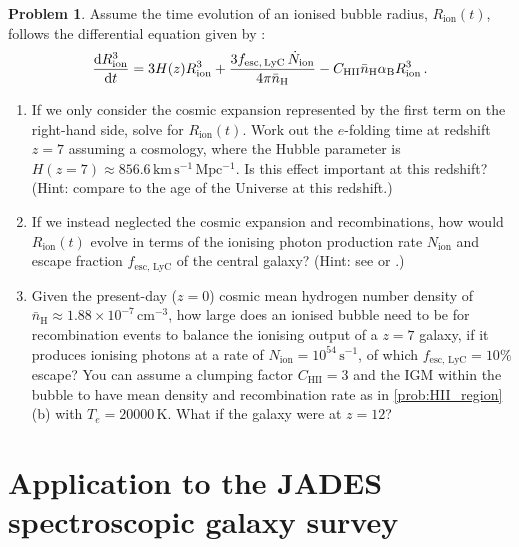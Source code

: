 \documentclass{article}
\theoremstyle{definition}
\newtheorem{problem}{Problem}[section]
\begin{document}
\begin{problem}
    \label{prob:bubble_radius_evolution}
    Assume the time evolution of an ionised bubble radius, $R_\text{ion}(t)$, follows the differential equation given by \citet{2000ApJ...542L..75C}:
    \begin{equation}
        \frac{\dif R_\mathrm{ion}^3}{\dif t} = 3 H(z) R_\mathrm{ion}^3 + \frac{3 f_\mathrm{esc, \, LyC} \, \dot{N}_\mathrm{ion}}{4\pi \bar{n}_\mathrm{H}} - C_\mathrm{HII} \bar{n}_\mathrm{H} \alpha_\mathrm{B} R_\mathrm{ion}^3 \, .
    \end{equation}
    \begin{enumerate}[label=(\alph*)]
        \item If we only consider the cosmic expansion represented by the first term on the right-hand side, solve for $R_\text{ion}(t)$. Work out the $e$-folding time at redshift $z = 7$ assuming a \citet{2020A&A...641A...6P} cosmology, where the Hubble parameter is $H(z=7) \approx 856.6 \, \mathrm{km \, s^{-1} \, Mpc^{-1}}$. Is this effect important at this redshift? (Hint: compare to the age of the Universe at this redshift.)
        \item If we instead neglected the cosmic expansion and recombinations, how would $R_\text{ion}(t)$ evolve in terms of the ionising photon production rate $N_\text{ion}$ and escape fraction $f_\text{esc, LyC}$ of the central galaxy? (Hint: see \citet{2020MNRAS.499.1395M} or \citet{2024A&A...682A..40W}.)
        \item Given the present-day ($z = 0$) cosmic mean hydrogen number density of $\bar{n}_\text{H} \approx 1.88 \times 10^{-7} \, \mathrm{cm^{-3}}$, how large does an ionised bubble need to be for recombination events to balance the ionising output of a $z = 7$ galaxy, if it produces ionising photons at a rate of $N_\text{ion} = 10^{54} \, \mathrm{s^{-1}}$, of which $f_\text{esc, LyC} = 10\%$ escape? You can assume a clumping factor $C_\mathrm{HII} = 3$ and the IGM within the bubble to have mean density and recombination rate as in \cref{prob:HII_region}(b) with $T_e = \num{20000} \, \mathrm{K}$. What if the galaxy were at $z = 12$?
    \end{enumerate}
\end{problem}

\section{Application to the JADES spectroscopic galaxy survey}
\end{document}
